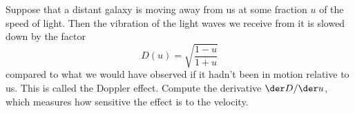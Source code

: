 Suppose that a distant galaxy is moving away from us at some fraction
$u$ of the speed of light. Then the vibration of the light waves we
receive from it is slowed down by the factor
\begin{equation*}
  D(u) = \sqrt{\frac{1-u}{1+u}}
\end{equation*}
compared to what we would have observed if it hadn't been in motion
relative to us. This is called the Doppler effect. Compute the derivative
$\der D/\der u$, which measures how sensitive the effect is to the velocity.\answercheck
